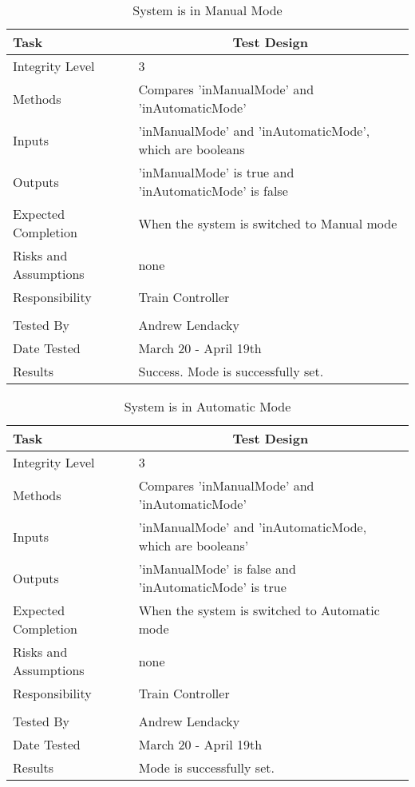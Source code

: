 \documentclass[]{article}
\begin{document}
\begin{table}[H]
	\centering
	\caption{System is in Manual Mode}
	\begin{tabular}{|l|l|}
		\hline
		Task & \multicolumn{1}{c|}{Test Design} \\ \hline
		Integrity Level & 3 \\ \hline
		Methods & Compares 'inManualMode' and 'inAutomaticMode'\\ \hline
		Inputs & 'inManualMode' and 'inAutomaticMode', which are booleans\\ \hline
		Outputs & 'inManualMode' is true and 'inAutomaticMode' is false \\ \hline
		Expected Completion & When the system is switched to Manual mode\\ \hline
		Risks and Assumptions & none\\ \hline
		Responsibility & Train Controller\\ \hline
			\\ \hline
		Tested By   &  Andrew Lendacky\\	\hline
		Date Tested & \parbox[t]{10cm}{March 20 - April 19th}\\ \hline
		Results & Success. Mode is successfully set.\\ \hline
	\end{tabular}
\end{table}

\begin{table}[H]
	\centering
	\caption{System is in Automatic Mode}
	\begin{tabular}{|l|l|}
		\hline
		Task & \multicolumn{1}{c|}{Test Design} \\ \hline
		Integrity Level & 3 \\ \hline
		Methods & Compares 'inManualMode' and 'inAutomaticMode'\\ \hline
		Inputs & 'inManualMode' and 'inAutomaticMode, which are booleans'\\ \hline
		Outputs & 'inManualMode' is false and 'inAutomaticMode' is true \\ \hline
		Expected Completion & When the system is switched to Automatic mode\\ \hline
		Risks and Assumptions & none\\ \hline
		Responsibility & Train Controller\\ \hline
			\\ \hline
		Tested By   &  Andrew Lendacky\\	\hline
		Date Tested & \parbox[t]{10cm}{March 20 - April 19th}\\ \hline
		Results & Mode is successfully set.\\ \hline
	\end{tabular}
\end{table}
\end{document}
